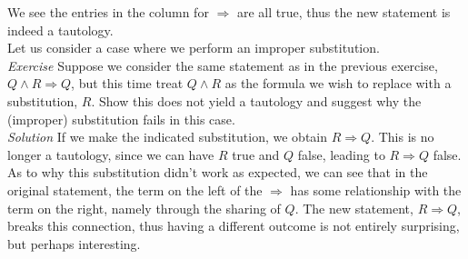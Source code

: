 We see the entries in the column for $\Longrightarrow$ are all true, thus the new statement is indeed a tautology.\\

Let us consider a case where we perform an improper substitution.\\

\textit{Exercise}  Suppose we consider the same statement as in the previous exercise, $Q \land R \Longrightarrow Q$, but this time treat $Q \land R$ as the formula we wish to replace with a substitution, $R$.  Show this does not yield a tautology and suggest why the (improper) substitution fails in this case.\\

\textit{Solution} If we make the indicated substitution, we obtain $R \Longrightarrow Q$.  This is no longer a tautology, since we can have $R$ true and $Q$ false, leading to $R \Longrightarrow Q$ false.  As to why this substitution didn't work as expected, we can see that in the original statement, the term on the left of the $\Longrightarrow$ has some relationship with the term on the right, namely through the sharing of $Q$.  The new statement, $R \Longrightarrow Q$, breaks this connection, thus having a different outcome is not entirely surprising, but perhaps interesting.


